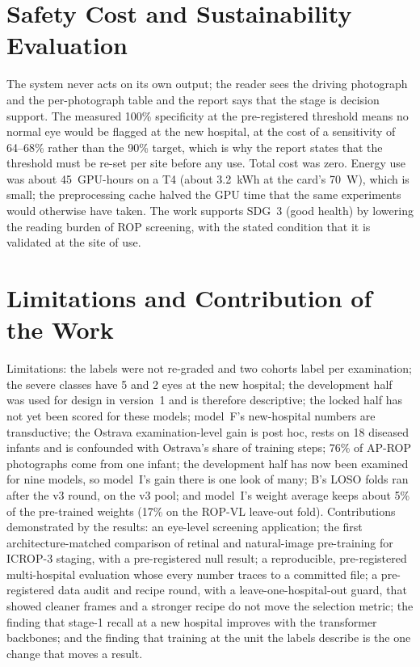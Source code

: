 \section{Safety Cost and Sustainability Evaluation}
The system never acts on its own output; the reader sees the driving photograph and the per-photograph table and the report says that the stage is decision support. The measured 100\% specificity at the pre-registered threshold means no normal eye would be flagged at the new hospital, at the cost of a sensitivity of 64--68\% rather than the 90\% target, which is why the report states that the threshold must be re-set per site before any use. Total cost was zero. Energy use was about 45~GPU-hours on a T4 (about 3.2~kWh at the card's 70~W), which is small; the preprocessing cache halved the GPU time that the same experiments would otherwise have taken. The work supports SDG~3 (good health) by lowering the reading burden of ROP screening, with the stated condition that it is validated at the site of use.

\section{Limitations and Contribution of the Work}
Limitations: the labels were not re-graded and two cohorts label per examination; the severe classes have 5 and 2 eyes at the new hospital; the development half was used for design in version~1 and is therefore descriptive; the locked half has not yet been scored for these models; model~F's new-hospital numbers are transductive; the Ostrava examination-level gain is post hoc, rests on 18 diseased infants and is confounded with Ostrava's share of training steps; 76\% of AP-ROP photographs come from one infant; the development half has now been examined for nine models, so model~I's gain there is one look of many; B's LOSO folds ran after the v3 round, on the v3 pool; and model~I's weight average keeps about 5\% of the pre-trained weights (17\% on the ROP-VL leave-out fold). Contributions demonstrated by the results: an eye-level screening application; the first architecture-matched comparison of retinal and natural-image pre-training for ICROP-3 staging, with a pre-registered null result; a reproducible, pre-registered multi-hospital evaluation whose every number traces to a committed file; a pre-registered data audit and recipe round, with a leave-one-hospital-out guard, that showed cleaner frames and a stronger recipe do not move the selection metric; the finding that stage-1 recall at a new hospital improves with the transformer backbones; and the finding that training at the unit the labels describe is the one change that moves a result.
